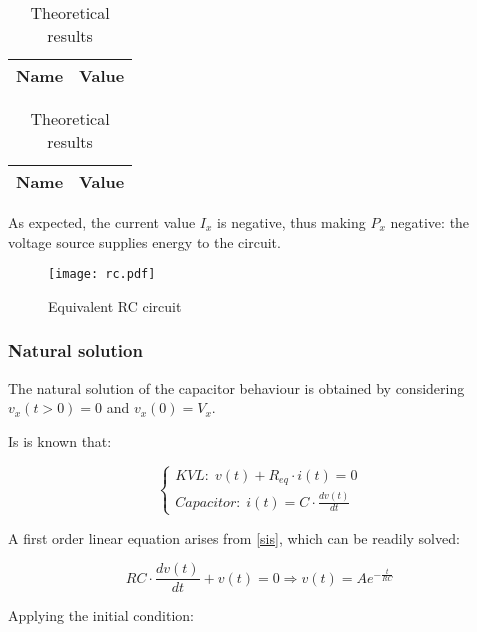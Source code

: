 \begin{table}[H]
  \centering
  \begin{tabular}{|c|c|}
    \hline
        {\bf Name} & {\bf Value} \\
        \hline
        \hline
        
        \hline
  \end{tabular}
  \caption{Theoretical results}
\end{table}

\begin{table}[H]
  \centering
  \begin{tabular}{|c|c|}
    \hline
        {\bf Name} & {\bf Value} \\
        \hline
        \hline
        
        \hline
  \end{tabular}
  \caption{Theoretical results}
\end{table}

As expected, the current value $I_x$ is negative, thus making $P_x$ negative: the voltage source supplies energy to the circuit.

\begin{figure}[H]
  \centering
  \texttt{[image: rc.pdf]}
  \caption{Equivalent RC circuit}
  \label{rc_fig}
\end{figure}


\subsubsection{Natural solution}

The natural solution of the capacitor behaviour is obtained by considering $v_x(t>0)=0$ and $v_x(0)=V_x$.

Is is known that:

\begin{equation}
  \begin{cases}
    KVL:\; v(t) + R_{eq} \cdot i(t) = 0 \\
    Capacitor:\; i(t) = C \cdot \frac{dv(t)}{dt}
  \end{cases}
  \label{sis}
\end{equation}

A first order linear equation arises from \ref{sis}, which can be readily solved:

\begin{equation}
  RC \cdot \frac{dv(t)}{dt} + v(t) = 0 \Rightarrow v(t) = Ae^{-\frac{t}{RC}}
\end{equation}

Applying the initial condition:

